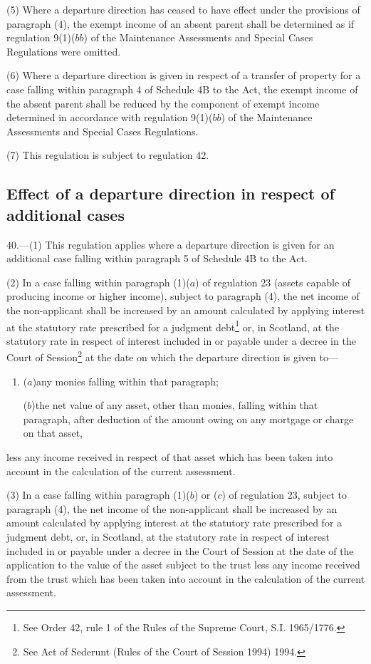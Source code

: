 \documentclass[a4paper]{article}
\begin{document}
(5) Where a departure direction has ceased to have effect under the provisions
of paragraph (4), the exempt income of an absent parent shall be determined as
if regulation 9(1)($bb$) of the Maintenance Assessments and Special Cases
Regulations were omitted.

(6) Where a departure direction is given in respect of a transfer of property
for a case falling within paragraph 4 of Schedule 4B to the Act, the exempt
income of the absent parent shall be reduced by the component of exempt income
determined in accordance with regulation 9(1)($bb$) of the Maintenance Assessments
and Special Cases Regulations.

(7) This regulation is subject to regulation 42.

\subsection[40. Effect of a departure direction in respect of additional cases]{Effect of a departure direction in respect of additional cases}

40.—(1) This
regulation applies where a departure direction is given for an additional case
falling within paragraph 5 of Schedule 4B to the Act.

(2) In a case falling within paragraph (1)($a$) of regulation 23 (assets capable
of producing income or higher income), subject to paragraph (4), the net income
of the non-applicant shall be increased by an amount calculated by applying
interest at the statutory rate prescribed for a judgment debt\footnote{\frenchspacing See Order 42, rule 1 of the Rules of the Supreme Court, S.I. 1965/1776.} or, in
Scotland, at the statutory rate in respect of interest included in or payable
under a decree in the Court of Session\footnote{\frenchspacing See Act of Sederunt (Rules of the Court of Session 1994) 1994.} at the date on which the departure
direction is given to—
\begin{enumerate}\item[]
($a$)any monies falling within that paragraph;

($b$)the net value of any asset, other than monies, falling within that paragraph,
after deduction of the amount owing on any mortgage or charge on that asset,
\end{enumerate}
less any income received in respect of that asset which has been taken into
account in the calculation of the current assessment.

(3) In a case falling within paragraph (1)($b$) or ($c$) of regulation 23, subject
to paragraph (4), the net income of the non-applicant shall be increased by an
amount calculated by applying interest at the statutory rate prescribed for a
judgment debt, or, in Scotland, at the statutory rate in respect of interest
included in or payable under a decree in the Court of Session at the date of the
application to the value of the asset subject to the trust less any income
received from the trust which has been taken into account in the calculation of
the current assessment.
\end{document}
